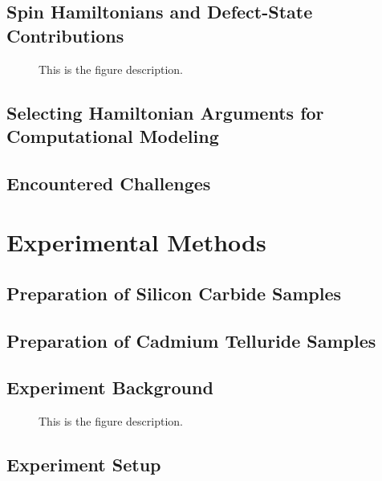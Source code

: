 \documentclass[oneside, astronomy, noacknowlegments]{BYUPhys}
\begin{document}
\section{Spin Hamiltonians and Defect-State Contributions}

\begin{figure}
    \caption[Example of spin-hamiltonion fields]{\label{fig:HamFields}
     This is the figure description.}
 \end{figure}

\section{Selecting Hamiltonian Arguments for Computational Modeling}

\section{Encountered Challenges}










\chapter{Experimental Methods}

\section{Preparation of Silicon Carbide Samples}
\label{sec:SiCSamples}

\section{Preparation of Cadmium Telluride Samples}

\section{Experiment Background}

\begin{figure}
    \caption[SiC energy levels and zero-field splitting]{\label{fig:SiCZeeman}
     This is the figure description.}
 \end{figure}

\section{Experiment Setup}
\label{sec:Experiment}
\end{document}
